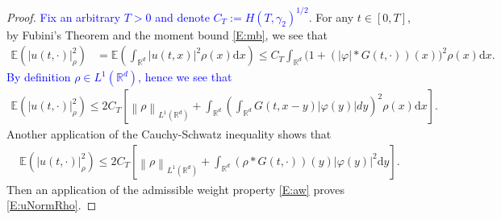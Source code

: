 \documentclass[a4paper,11pt]{article}%
\numberwithin{equation}{section}
\theoremstyle{plain}
\theoremstyle{definition}
\newcommand{\R}{\mathbb{R}}
\newcommand{\E}{\mathbb{E}}
\newcommand{\Norm}[1]{\left\|  #1   \right\|}
\newcommand{\ud}{\ensuremath{ \mathrm{d} }}
\begin{document}
\begin{proof}
	\textcolor{blue}{Fix an arbitrary $T>0$ and denote $C_T:=H(T,\gamma_2)^{	1/2}$}. For any $t\in [0,T]$, by Fubini's Theorem and the moment bound \eqref{E:mb}, we see that
	\begin{align*}
		\E\left(| u(t,\cdot)|_\rho^2\right)
		&= \E \left(\int_{\R^d}\vert u(t,x) \vert^2 \rho(x)\ud x\right)
		\le C_T \int_{\R^d}\bigg(1+(|\varphi|*G(t,\cdot))(x)\bigg)^2\rho(x)\ud x.
	\end{align*}
	\textcolor{blue}{By definition $\rho\in L^1(\R^d)$, hence we see that}
	\begin{align}
		\E\left(| u(t,\cdot)|_\rho^2\right)
		\le 2 C_T \left[ \Norm{\rho}_{L^1(\R^d)} + \int_{\R^d}\left(\int_{\R^d}G(t,x-y)|\varphi(y)|dy\right)^2\rho(x)\ud x\right]. \label{mstep}
	\end{align}
	Another application of the Cauchy-Schwatz inequality shows that
	\begin{align*}
		\E\left(| u(t,\cdot)|_\rho^2\right)
		\le 2 C_T \left[ \Norm{\rho}_{L^1(\R^d)} + \int_{\R^d}(\rho*G(t,\cdot))(y)|\varphi(y)|^2\ud y \right].
	\end{align*}
	Then an application of the admissible weight property \eqref{E:aw} proves \eqref{E:uNormRho}.



\end{proof}
\end{document}
